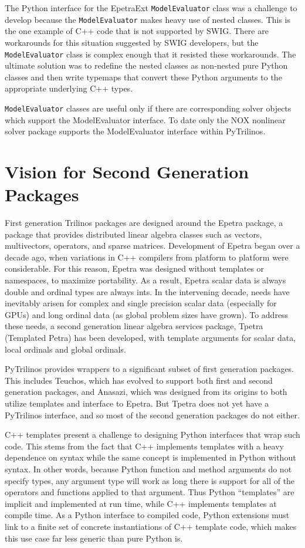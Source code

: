 \documentclass[11pt]{article}
\begin{document}
The Python interface for the EpetraExt {\tt ModelEvaluator} class was a challenge to develop because the {\tt ModelEvaluator} makes heavy use of nested classes.  This is the one example of C++ code that is not supported by SWIG.  There are workarounds for this situation suggested by SWIG developers, but the {\tt ModelEvaluator} class is complex enough that it resisted these workarounds.  The ultimate solution was to redefine the nested classes as non-nested pure Python classes and then write typemaps that convert these Python arguments to the appropriate underlying C++ types.

{\tt ModelEvaluator} classes are useful only if there are corresponding solver objects which support the ModelEvaluator interface.  To date only the NOX nonlinear solver package supports the ModelEvaluator interface within PyTrilinos.

\section{Vision for Second Generation Packages}
\label{sec:vision}

First generation Trilinos packages are designed around the Epetra package, a package that provides distributed linear algebra classes such as vectors, multivectors, operators, and sparse matrices.  Development of Epetra began over a decade ago, when variations in C++ compilers from platform to platform were considerable.  For this reason, Epetra was designed without templates or namespaces, to maximize portability.  As a result, Epetra scalar data is always double and ordinal types are always ints.  In the intervening decade, needs have inevitably arisen for complex and single precision scalar data (especially for GPUs) and long ordinal data (as global problem sizes have grown).  To address these needs, a second generation linear algebra services package, Tpetra (Templated Petra) has been developed, with template arguments for scalar data, local ordinals and global ordinals.

PyTrilinos provides wrappers to a significant subset of first generation packages.  This includes Teuchos, which has evolved to support both first and second generation packages, and Anasazi, which was designed from its origins to both utilize templates and interface to Epetra.  But Tpetra does not yet have a PyTrilinos interface, and so most of the second generation packages do not either.

C++ templates present a challenge to designing Python interfaces that wrap such code.  This stems from the fact that C++ implements templates with a heavy dependence on syntax while the same concept is implemented in Python without syntax.  In other words, because Python function and method arguments do not specify types, any argument type will work as long there is support for all of the operators and functions applied to that argument.  Thus Python ``templates'' are implicit and implemented at run time, while C++ implements templates at compile time.  As a Python interface to compiled code, Python extensions must link to a finite set of concrete instantiations of C++ template code, which makes this use case far less generic than pure Python is.
\end{document}
